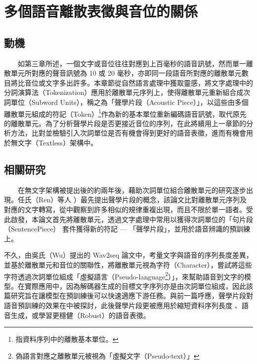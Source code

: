 
\chapter{多個語音離散表徵與音位的關係}   


\section{動機} %

　　如第三章所述，一個文字或音位往往對應到上百毫秒的語音訊號，然而單一離散單元所對應的聲音訊號為 10 或 20 毫秒，亦即同一段語音所對應的離散單元數目將比音位或文字多出許多。本章節從自然語言處理中獲取靈感，將文字處理中的分詞演算法（Tokenization）應用於離散單元序列上，使得離散單元重新組合成次詞單位（Subword Units），稱之為「聲學片段（Acoustic Piece）」，以這些由多個離散單元組成的符記（Token）\footnote{指資料序列中的離散基本單位。}作為新的基本單位重新編碼語音訊號，取代原先的離散單元。為了分析聲學片段是否更接近音位的序列，在此將續用上一章節的分析方法，比對並檢驗引入次詞單位是否有機會得到更好的語音表徵，進而有機會用於無文字（Textless）架構\cite{lakhotia_generative_2021, lakhotia_generative_2021-1, noauthor_textless_2021}中。

\section{相關研究} 

　　在無文字架構被提出後的約兩年後，藉助次詞單位組合離散單元的研究逐步出現。任氏（Ren）等人 \cite{ren_speech_2022}）最先提出聲學片段的概念，該論文比對離散單元序列及對應的文字轉寫，從中觀察到許多相似的規律重複出現，而且不限於單一語者。受此啟發，本論文首先將離散單元，透過文字處理中常用以獲得次詞單位的「句片段（SentencePiece） \cite{kudo_sentencepiece_2018} 套件獲得新的符記 --- 「聲學片段」，並用於語音辨識的預訓練上。

        不久，由吳氏（Wu）提出的 Wav2seq \cite{wu_wav2seq_2023}論文中，考量文字與語音的序列長度差異，並基於離散單元和音位的關聯性，將離散單元視為字符（Character），嘗試將這些字符透過次詞單位組成「虛擬語言（Pseudo-language\footnote{偽語言對應之離散單元被視為「虛擬文字（Pseudo-text）」}）」，來幫助語音到文字的模型。在實際應用中，因為解碼器生成的目標文字序列亦是由次詞單位組成，因此該篇研究旨在讓模型在預訓練後可以快速適應下游任務。與前一篇呼應，聲學片段對語音預訓練的效果在\cite{10096788}中被探討，此後聲學片段更被應用於縮短資料序列長度\cite{chang_exploration_2023} 、語音生成\cite{shen2024acoustic}，或學習更穩健（Robust）的語音表徵\cite{chang2023r}。

